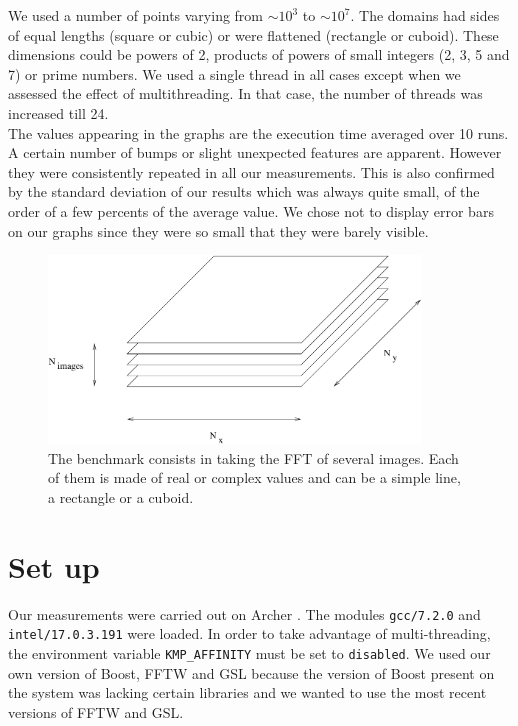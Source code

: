 \documentclass[12pt, a4paper]{article}
\begin{document}
We used a number of points varying from $\sim 10^3$ to $\sim 10^7$. The domains had sides of equal lengths (square or cubic) or were flattened (rectangle or cuboid). These dimensions could be powers of 2, products of powers of small integers (2, 3, 5 and 7) or prime numbers. We used a single thread in all cases except when we assessed the effect of multithreading. In that case, the number of threads was increased till 24.\\

The values appearing in the graphs are the execution time averaged over 10 runs. A certain number of bumps or slight unexpected features are apparent. However they were consistently repeated in all our measurements. This is also confirmed by the standard deviation of our results which was always quite small, of the order of a few percents of the average value. We chose not to display error bars on our graphs since they were so small that they were barely visible. 

\begin{figure}[H]
\captionsetup{width=0.6\textwidth}
\centering
\includegraphics[height=5cm]{benchmark.pdf}
\caption{The benchmark consists in taking the FFT of several images. Each of them is made of real or complex values and can be a simple line, a rectangle or a cuboid.}
\label{benchmark}
\end{figure}

\section{Set up}
Our measurements were carried out on Archer \cite{archer}. The modules \texttt{gcc/7.2.0} and \\ \texttt{intel/17.0.3.191} were loaded. In order to take advantage of multi-threading, the environment variable \texttt{KMP\_AFFINITY} must be set to \texttt{disabled}. We used our own version of Boost, FFTW and GSL because the version of Boost present on the system was lacking certain libraries and we wanted to use the most recent versions of FFTW and GSL.\\
\end{document}
